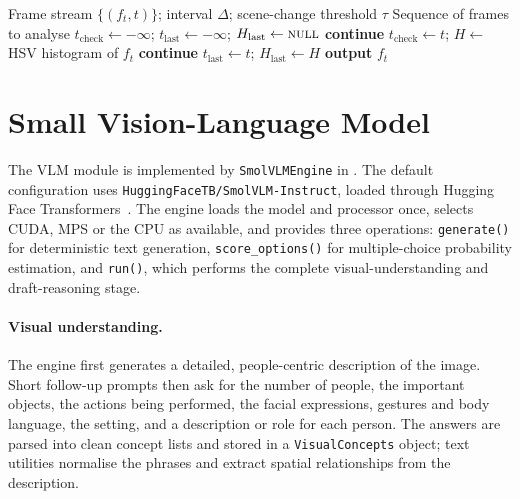 \documentclass[12pt,a4paper,oneside]{report}
\newcommand{\code}[1]{\texttt{#1}}
\begin{document}
\begin{algorithm}[htbp]
\caption{Frame sampling for video and live camera}
\label{alg:framesample}
\begin{algorithmic}[1]
\Require Frame stream $\{(f_t, t)\}$; interval $\Delta$; scene-change threshold $\tau$
\Ensure Sequence of frames to analyse
\State $t_{\text{check}} \gets -\infty$;\; $t_{\text{last}} \gets -\infty$;\; $H_{\text{last}} \gets \textsc{null}$
    \State \textbf{continue}
  \EndIf
  \State $t_{\text{check}} \gets t$;\; $H \gets$ HSV histogram of $f_t$
    \State \textbf{continue} 
  \EndIf
  \State $t_{\text{last}} \gets t$;\; $H_{\text{last}} \gets H$
  \State \textbf{output} $f_t$
\EndFor
\end{algorithmic}
\end{algorithm}

\section{Small Vision-Language Model}
\label{sec:vlm}

The VLM module is implemented by \code{SmolVLMEngine} in .
The default configuration uses \code{HuggingFaceTB/SmolVLM-Instruct}, loaded
through Hugging Face Transformers~\cite{wolf2020transformers}. The engine loads
the model and processor once, selects CUDA, MPS or the CPU as available, and
provides three operations: \code{generate()} for deterministic text generation,
\code{score\_options()} for multiple-choice probability estimation, and
\code{run()}, which performs the complete visual-understanding and
draft-reasoning stage.

\paragraph{Visual understanding.} The engine first generates a detailed,
people-centric description of the image. Short follow-up prompts then ask for
the number of people, the important objects, the actions being performed, the
facial expressions, gestures and body language, the setting, and a description
or role for each person. The answers are parsed into clean concept lists and
stored in a \code{VisualConcepts} object; text utilities normalise the phrases
and extract spatial relationships from the description.
\end{document}
